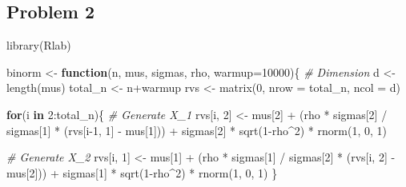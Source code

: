 \documentclass[
]{article}
\newenvironment{Shaded}{\begin{snugshade}}{\end{snugshade}}
\newcommand{\AttributeTok}[1]{\textcolor[rgb]{0.77,0.63,0.00}{#1}}
\newcommand{\CommentTok}[1]{\textcolor[rgb]{0.56,0.35,0.01}{\textit{#1}}}
\newcommand{\ControlFlowTok}[1]{\textcolor[rgb]{0.13,0.29,0.53}{\textbf{#1}}}
\newcommand{\DecValTok}[1]{\textcolor[rgb]{0.00,0.00,0.81}{#1}}
\newcommand{\FunctionTok}[1]{\textcolor[rgb]{0.00,0.00,0.00}{#1}}
\newcommand{\NormalTok}[1]{#1}
\newcommand{\OtherTok}[1]{\textcolor[rgb]{0.56,0.35,0.01}{#1}}
\newcommand{\SpecialCharTok}[1]{\textcolor[rgb]{0.00,0.00,0.00}{#1}}
\begin{document}
\hypertarget{problem-2-1}{%
\subsection{Problem 2}\label{problem-2-1}}

\begin{Shaded}
\begin{Highlighting}[]
\FunctionTok{library}\NormalTok{(Rlab)}
\end{Highlighting}
\end{Shaded}

\begin{Shaded}
\begin{Highlighting}[]
\NormalTok{binorm }\OtherTok{\textless{}{-}} \ControlFlowTok{function}\NormalTok{(n, mus, sigmas, rho, }\AttributeTok{warmup=}\DecValTok{10000}\NormalTok{)\{}
  \CommentTok{\# Dimension}
\NormalTok{  d }\OtherTok{\textless{}{-}} \FunctionTok{length}\NormalTok{(mus)}
\NormalTok{  total\_n }\OtherTok{\textless{}{-}}\NormalTok{ n}\SpecialCharTok{+}\NormalTok{warmup}
\NormalTok{  rvs }\OtherTok{\textless{}{-}} \FunctionTok{matrix}\NormalTok{(}\DecValTok{0}\NormalTok{, }\AttributeTok{nrow =}\NormalTok{ total\_n, }\AttributeTok{ncol =}\NormalTok{ d)}
  
  \ControlFlowTok{for}\NormalTok{(i }\ControlFlowTok{in} \DecValTok{2}\SpecialCharTok{:}\NormalTok{total\_n)\{}
    \CommentTok{\# Generate X\_1}
\NormalTok{    rvs[i, }\DecValTok{2}\NormalTok{] }\OtherTok{\textless{}{-}}\NormalTok{ mus[}\DecValTok{2}\NormalTok{] }\SpecialCharTok{+}\NormalTok{ (rho }\SpecialCharTok{*}\NormalTok{ sigmas[}\DecValTok{2}\NormalTok{] }\SpecialCharTok{/}\NormalTok{ sigmas[}\DecValTok{1}\NormalTok{] }\SpecialCharTok{*}\NormalTok{ (rvs[i}\DecValTok{{-}1}\NormalTok{, }\DecValTok{1}\NormalTok{] }\SpecialCharTok{{-}}\NormalTok{ mus[}\DecValTok{1}\NormalTok{])) }\SpecialCharTok{+}\NormalTok{ sigmas[}\DecValTok{2}\NormalTok{] }\SpecialCharTok{*} \FunctionTok{sqrt}\NormalTok{(}\DecValTok{1}\SpecialCharTok{{-}}\NormalTok{rho}\SpecialCharTok{\^{}}\DecValTok{2}\NormalTok{) }\SpecialCharTok{*} \FunctionTok{rnorm}\NormalTok{(}\DecValTok{1}\NormalTok{, }\DecValTok{0}\NormalTok{, }\DecValTok{1}\NormalTok{)}
    
    \CommentTok{\# Generate X\_2}
\NormalTok{    rvs[i, }\DecValTok{1}\NormalTok{] }\OtherTok{\textless{}{-}}\NormalTok{ mus[}\DecValTok{1}\NormalTok{] }\SpecialCharTok{+}\NormalTok{ (rho }\SpecialCharTok{*}\NormalTok{ sigmas[}\DecValTok{1}\NormalTok{] }\SpecialCharTok{/}\NormalTok{ sigmas[}\DecValTok{2}\NormalTok{] }\SpecialCharTok{*}\NormalTok{ (rvs[i, }\DecValTok{2}\NormalTok{] }\SpecialCharTok{{-}}\NormalTok{ mus[}\DecValTok{2}\NormalTok{])) }\SpecialCharTok{+}\NormalTok{ sigmas[}\DecValTok{1}\NormalTok{] }\SpecialCharTok{*} \FunctionTok{sqrt}\NormalTok{(}\DecValTok{1}\SpecialCharTok{{-}}\NormalTok{rho}\SpecialCharTok{\^{}}\DecValTok{2}\NormalTok{) }\SpecialCharTok{*} \FunctionTok{rnorm}\NormalTok{(}\DecValTok{1}\NormalTok{, }\DecValTok{0}\NormalTok{, }\DecValTok{1}\NormalTok{)}
\NormalTok{  \}}
  

\end{Highlighting}
\end{Shaded}
\end{document}
